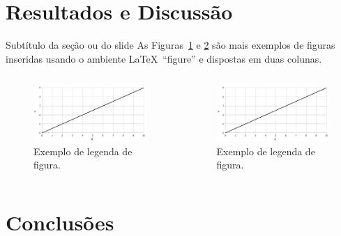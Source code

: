 \documentclass[%
  10pt,%
  aspectratio = 169,%
  compress,%
  t,%
]{beamer}%
\begin{document}
\section{Resultados e Discussão}\label{sec:resdisc}

\begin{frame}{}{Subtítulo da seção ou do slide}
As Figuras~\ref{fig:graficoxy1} e \ref{fig:graficoxy2} são mais exemplos de figuras inseridas usando o ambiente \LaTeX\ ``figure'' e dispostas em duas colunas.
\begin{columns}[t]
\begin{figure}[!htb]
\centering
\caption{Exemplo de legenda de figura.}
\label{fig:graficoxy1}
\includegraphics[width = 0.8\columnwidth]{./Figuras/graficoxy}
\end{figure}
\begin{figure}[!htb]
\centering
\caption{Exemplo de legenda de figura.}
\label{fig:graficoxy2}
\includegraphics[width = 0.8\columnwidth]{./Figuras/graficoxy}
\end{figure}
\end{columns}
\end{frame}

\section{Conclusões}\label{sec:concl}
\end{document}
